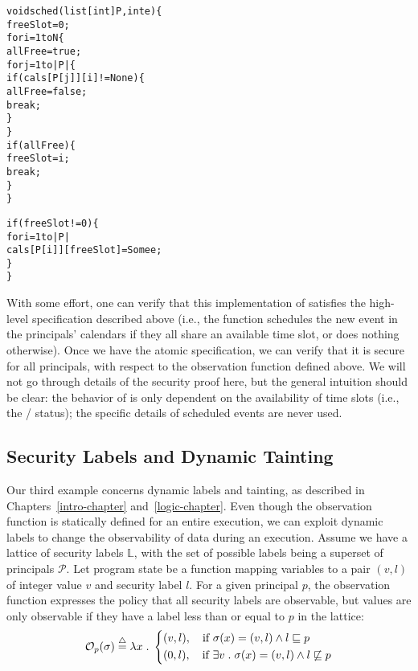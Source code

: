 {\small\begin{alltt}
  void sched(list[int] P, int e) \{
      freeSlot = 0;
      for i = 1 to N \{
         allFree = true;
         for j = 1 to |P| \{
            if (cals[P[j]][i] != None) \{
               allFree = false;
               break;
            \}
         \}
         if (allFree) \{
            freeSlot = i;
            break;
         \}
      \}

      if (freeSlot != 0) \{
         for i = 1 to |P|
            cals[P[i]][freeSlot] = Some e;
      \}
  \}
\end{alltt}}%

With some effort, one can verify that this 
implementation of  satisfies the high-level
specification described above (i.e., the function schedules 
the new event in the principals' calendars if they all share an available
time slot, or does nothing otherwise). Once we have the atomic
specification, we can verify that it is secure for all principals,
with respect to the observation function defined above. We
will not go through details of the security proof here, but the
general intuition should be clear: the behavior of  
is only dependent on the availability of time slots 
(i.e., the \none{}/ status); the specific details
of scheduled events are never used.

\subsection{Security Labels and Dynamic Tainting}

Our third example concerns dynamic labels and tainting, as described
in Chapters~\ref{intro-chapter} and~\ref{logic-chapter}.
Even though the observation function
is statically defined for an entire execution, we can exploit dynamic labels
to change the observability of data during an execution.
Assume we have a lattice of security labels $\mathbb{L}$, with the set
of possible labels being a superset of principals $\mathcal{P}$.
Let program state be a function mapping variables to a pair $(v,l)$
of integer value $v$ and security label $l$. For a given principal $p$, 
the observation function expresses the policy that all security labels
are observable, but values are only observable if they have a 
label less than or equal to $p$ in the lattice:
{\small\begin{align*}
\mathcal{O}_{p}(\sigma) \stackrel{\triangle}{=} \lambda x \hspace{1mm} . \hspace{1mm}  
\left\{
\begin{aligned}
&(v,l), \quad \text{if } \sigma(x) = (v,l) \land l \sqsubseteq p \\
&(0,l), \quad \text{if } \exists v \hspace{1mm} . \hspace{1mm} \sigma(x) = (v,l) \land l \not\sqsubseteq p
\end{aligned}\right.
\end{align*}}%

